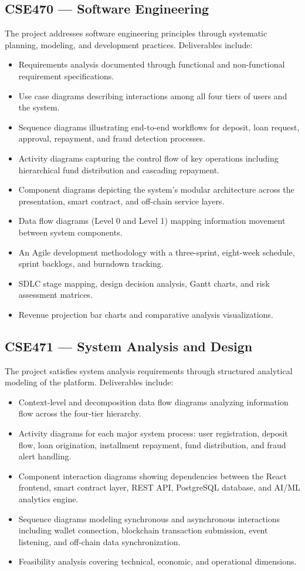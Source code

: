 \documentclass[11pt,a4paper]{article}
\begin{document}
\subsection{CSE470 --- Software Engineering}

The project addresses software engineering principles through systematic planning, modeling, and development practices. Deliverables include:
\begin{itemize}[noitemsep]
\item Requirements analysis documented through functional and non-functional requirement specifications.
\item Use case diagrams describing interactions among all four tiers of users and the system.
\item Sequence diagrams illustrating end-to-end workflows for deposit, loan request, approval, repayment, and fraud detection processes.
\item Activity diagrams capturing the control flow of key operations including hierarchical fund distribution and cascading repayment.
\item Component diagrams depicting the system's modular architecture across the presentation, smart contract, and off-chain service layers.
\item Data flow diagrams (Level 0 and Level 1) mapping information movement between system components.
\item An Agile development methodology with a three-sprint, eight-week schedule, sprint backlogs, and burndown tracking.
\item SDLC stage mapping, design decision analysis, Gantt charts, and risk assessment matrices.
\item Revenue projection bar charts and comparative analysis visualizations.
\end{itemize}

\subsection{CSE471 --- System Analysis and Design}

The project satisfies system analysis requirements through structured analytical modeling of the platform. Deliverables include:
\begin{itemize}[noitemsep]
\item Context-level and decomposition data flow diagrams analyzing information flow across the four-tier hierarchy.
\item Activity diagrams for each major system process: user registration, deposit flow, loan origination, installment repayment, fund distribution, and fraud alert handling.
\item Component interaction diagrams showing dependencies between the React frontend, smart contract layer, REST API, PostgreSQL database, and AI/ML analytics engine.
\item Sequence diagrams modeling synchronous and asynchronous interactions including wallet connection, blockchain transaction submission, event listening, and off-chain data synchronization.
\item Feasibility analysis covering technical, economic, and operational dimensions.
\end{itemize}
\end{document}
